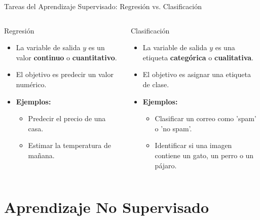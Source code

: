 \documentclass[aspectratio=169,xcolor=dvipsnames]{beamer}
\begin{document}
\begin{frame}{Tareas del Aprendizaje Supervisado: Regresión vs. Clasificación}
    \begin{columns}[t]
            \begin{block}{Regresión}
                \begin{itemize}
                    \item La variable de salida $y$ es un valor \textbf{continuo} o \textbf{cuantitativo}.
                    \item El objetivo es predecir un valor numérico.
                    \item \textbf{Ejemplos:}
                        \begin{itemize}
                            \item Predecir el precio de una casa.
                            \item Estimar la temperatura de mañana.
                        \end{itemize}
                \end{itemize}
            \end{block}

            \begin{alertblock}{Clasificación}
                 \begin{itemize}
                    \item La variable de salida $y$ es una etiqueta \textbf{categórica} o \textbf{cualitativa}.
                    \item El objetivo es asignar una etiqueta de clase.
                    \item \textbf{Ejemplos:}
                        \begin{itemize}
                            \item Clasificar un correo como 'spam' o 'no spam'.
                            \item Identificar si una imagen contiene un gato, un perro o un pájaro.
                        \end{itemize}
                \end{itemize}
            \end{alertblock}
    \end{columns}
\end{frame}

\section{Aprendizaje No Supervisado}
\end{document}
